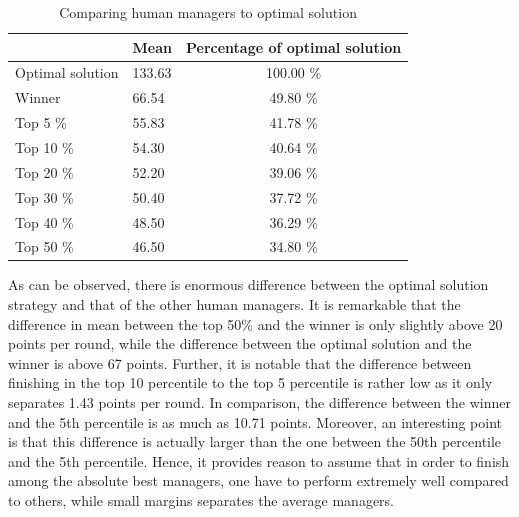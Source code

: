 \begin{table}[H]
\centering
\caption{Comparing human managers to optimal solution}
\label{Optimal_Human}
\begin{tabular}{llc}
\hline
                 & Mean   & \multicolumn{1}{l}{Percentage of optimal solution} \\
\hline                 
Optimal solution & 133.63 & 100.00 \%                                          \\
Winner           & 66.54  & 49.80 \%                                           \\
Top 5 \%         & 55.83  & 41.78 \%                                           \\
Top 10 \%        & 54.30  & 40.64 \%                                           \\
Top 20 \%        & 52.20  & 39.06 \%                                           \\
Top 30 \%        & 50.40  & 37.72 \%                                           \\
Top 40 \%        & 48.50  & 36.29 \%                                           \\
Top 50 \%        & 46.50  & 34.80 \%                                           \\
\hline
\end{tabular}
\end{table}

As can be observed, there is enormous difference between the optimal solution strategy and that of the other human managers. It is remarkable that the difference in mean between the top 50\% and the winner is only slightly above 20 points per round, while the difference between the optimal solution and the winner is above 67 points. Further, it is notable that the difference between finishing in the top 10 percentile to the top 5 percentile is rather low as it only separates 1.43 points per round. In comparison, the difference between the winner and the 5th percentile is as much as 10.71 points. Moreover, an interesting point is that this difference is actually larger than the one between the 50th percentile and the 5th percentile. Hence, it provides reason to assume that in order to finish among the absolute best managers, one have to perform extremely well compared to others, while small margins separates the average managers. 
\newpar
 

